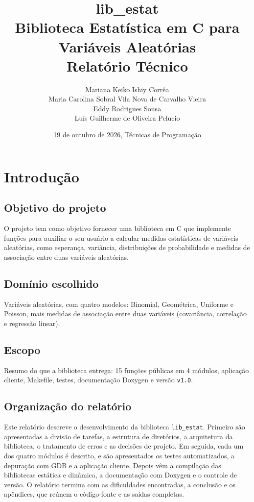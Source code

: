 \documentclass[12pt,a4paper]{article}
\title{\textbf{lib\_estat}\\[0.3em]
       \large Biblioteca Estatística em C para Variáveis Aleatórias\\[0.3em]
       \large Relatório Técnico}
\author{
  Mariana Keiko Ishiy Corrêa\\
  Maria Carolina Sobral Vila Nova de Carvalho Vieira \\
  Eddy Rodrigues Sousa \\
  Luís Guilherme de Oliveira Pelucio
}
\date{19 de outubro de 2026, Técnicas de Programação}
\newcommand{\cod}[1]{\texttt{#1}}
\begin{document}
\maketitle
\thispagestyle{empty}
\newpage

\tableofcontents
\newpage

\section{Introdução}

\subsection{Objetivo do projeto}
O projeto tem como objetivo fornecer uma biblioteca em C que implemente funções para
auxiliar o seu usuário a calcular medidas estatísticas de variáveis aleatórias, como
esperança, variância, distribuições de probabilidade e medidas de associação entre
duas variáveis aleatórias. 


\subsection{Domínio escolhido}
Variáveis aleatórias, com quatro modelos: Binomial, Geométrica, Uniforme e
Poisson, mais medidas de associação entre duas variáveis (covariância,
correlação e regressão linear).

\subsection{Escopo}
Resumo do que a biblioteca entrega: 15 funções públicas em 4 módulos, aplicação
cliente, Makefile, testes, documentação Doxygen e versão \cod{v1.0}.

\subsection{Organização do relatório}

Este relatório descreve o desenvolvimento da biblioteca \cod{lib\_estat}. Primeiro são apresentadas a divisão de tarefas, a estrutura de diretórios, a arquitetura da biblioteca, o tratamento de erros e as decisões de projeto. Em seguida, cada um dos quatro módulos é descrito, e são apresentados os testes automatizados, a depuração com GDB e a aplicação cliente. Depois vêm a compilação das bibliotecas estática e dinâmica, a documentação com Doxygen e o controle de versão. O relatório termina com as dificuldades encontradas, a conclusão e os apêndices, que reúnem o código-fonte e as saídas completas.
\end{document}
